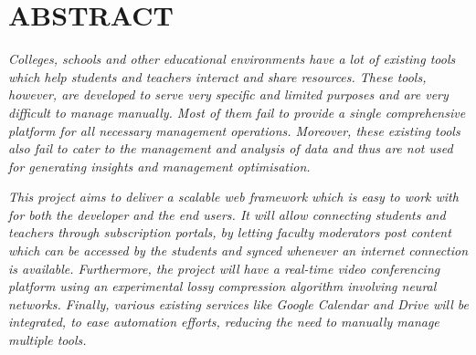 \chapter*{ABSTRACT}

\emph{Colleges, schools and other educational environments have a lot of existing tools which help students and teachers interact and share resources. 
These tools, however, are developed to serve very specific and limited purposes and are very difficult to manage manually. 
Most of them fail to provide a single comprehensive platform for all necessary management operations. 
Moreover, these existing tools also fail to cater to the management and analysis of data and thus are not used for generating insights and management optimisation.}

\emph{This project aims to deliver a scalable web framework which is easy to work with for both the developer and the end users. 
It will allow connecting students and teachers through subscription portals, by letting faculty moderators post content which can be accessed by the students and synced whenever an internet connection is available. 
Furthermore, the project will have a real-time video conferencing platform 
using an experimental lossy compression algorithm involving neural networks. 
Finally, various existing services like Google Calendar and Drive will be integrated, to ease 
automation efforts, reducing the need to manually manage multiple tools.}
